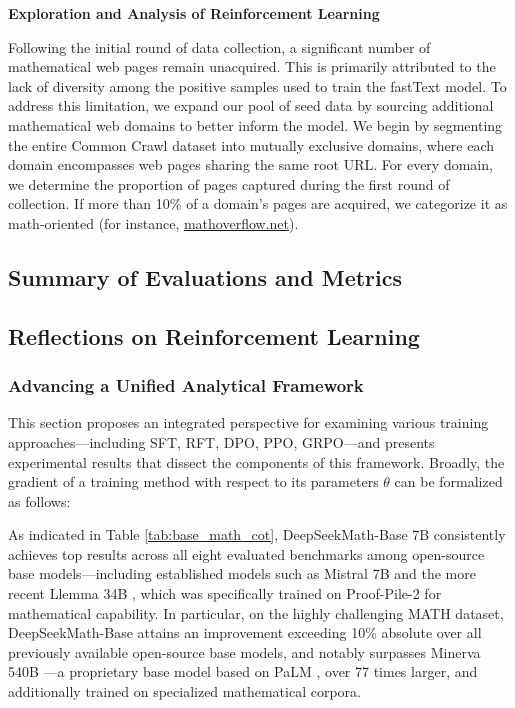 \textbf{Exploration and Analysis of Reinforcement Learning}

Following the initial round of data collection, a significant number of mathematical web pages remain unacquired. This is primarily attributed to the lack of diversity among the positive samples used to train the fastText model. To address this limitation, we expand our pool of seed data by sourcing additional mathematical web domains to better inform the model. We begin by segmenting the entire Common Crawl dataset into mutually exclusive domains, where each domain encompasses web pages sharing the same root URL. For every domain, we determine the proportion of pages captured during the first round of collection. If more than 10\% of a domain's pages are acquired, we categorize it as math-oriented (for instance, \url{mathoverflow.net}).

\subsection{Summary of Evaluations and Metrics}

\subsection{Reflections on Reinforcement Learning}
\subsubsection{Advancing a Unified Analytical Framework} This section proposes an integrated perspective for examining various training approaches—including SFT, RFT, DPO, PPO, GRPO—and presents experimental results that dissect the components of this framework. Broadly, the gradient of a training method with respect to its parameters $\theta$ can be formalized as follows:

As indicated in Table \ref{tab:base_math_cot}, DeepSeekMath-Base 7B consistently achieves top results across all eight evaluated benchmarks among open-source base models—including established models such as Mistral 7B \citep{mistral} and the more recent Llemma 34B \citep{llemma}, which was specifically trained on Proof-Pile-2 \citep{llemma} for mathematical capability. In particular, on the highly challenging MATH dataset, DeepSeekMath-Base attains an improvement exceeding 10\% absolute over all previously available open-source base models, and notably surpasses Minerva 540B \citep{minerva}—a proprietary base model based on PaLM \citep{palm}, over 77 times larger, and additionally trained on specialized mathematical corpora.

